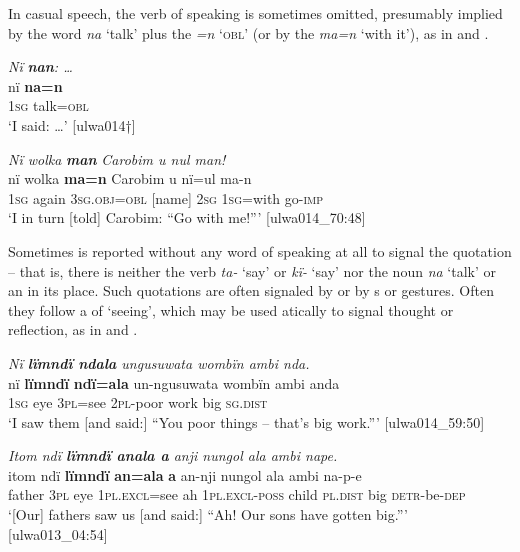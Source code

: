 In casual speech, the verb of speaking is sometimes omitted, presumably implied by the word \textit{na} ‘talk’ plus the  \textit{=n} ‘\textsc{obl}’ (or by the    \textit{ma=n} ‘with it’), as in  and .

\newpage

\ea%
    \label{ex:syntax:219}
          \textit{Nï} \textbf{\textit{nan}}\textit{: …}\\
\gll    nï    \textbf{na=n}\\
    1\textsc{sg}  talk=\textsc{obl}\\
\glt `I said: …’ [ulwa014†]
\z

\ea%
    \label{ex:syntax:220}
          \textit{Nï wolka} \textbf{\textit{man}} \textit{Carobim u nul man!}\\
\gll    nï    wolka  \textbf{ma=n}      Carobim  u    nï=ul    ma-n\\
    1\textsc{sg}  again  3\textsc{sg.obj=obl}  [name]    2\textsc{sg}  1\textsc{sg}=with  go-\textsc{imp}\\
\glt `I in turn [told] Carobim: “Go with me!”’ [ulwa014\_70:48]
\z

Sometimes  is reported without any word of speaking at all to signal the quotation -- that is, there is neither the verb \textit{ta-} ‘say’ or \textit{kï-} ‘say’ nor the noun \textit{na} ‘talk’ or an  in its place. Such quotations are often signaled by  or by s or  gestures. Often they follow a  of ‘seeing’, which may be used atically to signal thought or reflection, as in  and .

\ea%
    \label{ex:syntax:221}
          \textit{Nï \textbf{lïmndï ndala} ungusuwata wombïn ambi nda.}\\
\gll    nï    \textbf{lïmndï}  \textbf{ndï=ala}  un-ngusuwata  wombïn  ambi  anda\\
    1\textsc{sg}  eye    3\textsc{pl}=see  2\textsc{pl-}poor    work    big    \textsc{sg.dist}\\
\glt `I saw them [and said:] “You poor things – that’s big work.”’ [ulwa014\_59:50]
\z

\ea%
    \label{ex:syntax:222}
          \textit{Itom ndï \textbf{lïmndï anala a} anji nungol ala ambi nape.}\\
\gll    itom  ndï  \textbf{lïmndï}  \textbf{an=ala}      \textbf{a}  an-nji        nungol ala      ambi  na-p-e\\
    father  3\textsc{pl}  eye    \textsc{1pl.excl}=see  ah  1\textsc{pl.excl-poss}  child    \textsc{pl.dist}  big    \textsc{detr-}be\textsc{{}-dep}\\
\glt `[Our] fathers saw us [and said:] “Ah! Our sons have gotten big.”’ [ulwa013\_04:54]
\z

